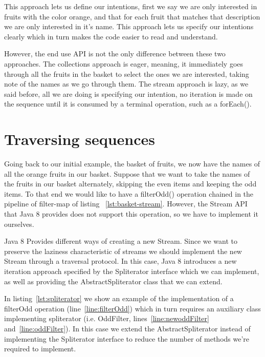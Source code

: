 

This approach lets us define our intentions, first we say we are only interested in fruits with the color orange, and that for each fruit that matches that description we are only interested in it's name. This approach lets us specify our intentions clearly which in turn makes the code easier to read and understand. 

However, the end use API is not the only difference between these two approaches. The collections approach is eager, meaning, it immediately goes through all the fruits in the basket to select the ones we are interested, taking note of the names as we go through them. The stream approach is lazy, as we said before, all we are doing is specifying our intention, no iteration is made on the sequence until it is consumed by a terminal operation, such as a forEach().

\section{Traversing sequences}

Going back to our initial example, the basket of fruits, we now have the names of all the orange fruits in our basket. Suppose that we want to take the names of the fruits in our basket alternately, skipping the even items and keeping the odd items. To that end we would like to have a filterOdd() operation chained in the pipeline of filter-map of listing ~\ref{lst:basket-stream}. However, the Stream API that Java 8 provides does not support this operation, so we have to implement it ourselves.

Java 8 Provides different ways of creating a new Stream. Since we want to preserve the laziness characteristic of streams we should implement the new Stream through a traversal protocol. In this case, Java 8 introduces a new iteration approach specified by the Spliterator interface which we can implement, as well as providing the AbstractSpliterator class that we can extend.

In listing~\ref{lst:spliterator} we show an example of the implementation of a filterOdd operation (line~\ref{line:filterOdd}) which in turn requires an auxiliary class implementing spliterator (i.e. OddFilter, lines~\ref{line:newoddFilter} and~\ref{line:oddFilter}). In this case we extend the AbstractSpliterator instead of implementing the Spliterator interface to reduce the number of methods we're required to implement.

